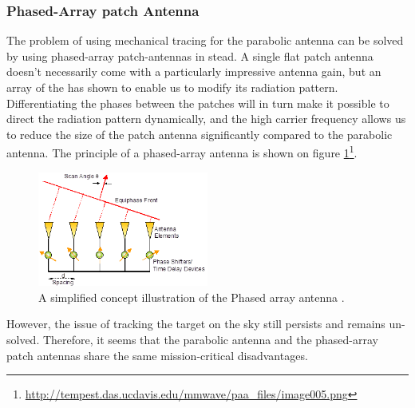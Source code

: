 \subsubsection{Phased-Array patch Antenna}
The problem of using mechanical tracing for the parabolic antenna can be solved by using phased-array patch-antennas in stead. A single flat patch antenna doesn't necessarily come with a particularly impressive antenna gain, but an array of the has shown to enable us to modify its radiation pattern. Differentiating the phases between the patches will in turn make it possible to direct the radiation pattern dynamically, and the high carrier frequency allows us to reduce the size of the patch antenna significantly compared to the parabolic antenna. The principle of a phased-array antenna is shown on figure \ref{fig:phased}\footnote{\url{http://tempest.das.ucdavis.edu/mmwave/paa_files/image005.png}}.\\
\begin{figure}[!htb]
	\centering
	\includegraphics[width=0.5\textwidth]{figures/Rasmus/phased}
	\caption{A simplified concept illustration of the Phased array antenna .
	\label{fig:phased}}
\end{figure}
However, the issue of tracking the target on the sky still persists and remains un-solved. Therefore, it seems that the parabolic antenna and the phased-array patch antennas share the same mission-critical disadvantages.


